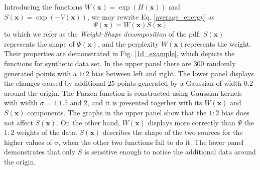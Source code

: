\documentclass[preprint,12pt]{elsarticle}
\begin{document}
Introducing the functions $W\left(\mathbf{x}\right)=\exp\left(H\left(\mathbf{x}\right)\right)$ and $S\left(\mathbf{x}\right)=\exp\left(-V\left(\mathbf{x}\right)\right)$, we may rewrite Eq. \ref{average_energy} as
\begin{equation}\label{weight_shape_decomposition}
  \Psi\left(\mathbf{x}\right)=W\left(\mathbf{x}\right)S\left(\mathbf{x}\right)
\end{equation}
to which we refer as the \textit{Weight-Shape decomposition} of the pdf. $S\left(\mathbf{x}\right)$ represents the shape of $\Psi\left(\mathbf{x}\right)$, and the perplexity $W\left(\mathbf{x}\right)$represents the weight. Their properties are demonstrated in Fig. \ref{1d_example}, which depicts the functions for synthetic data set. In the upper panel there are $300$ randomly generated points with a $1:2$ bias between left and right. The lower panel displays the changes caused by additional $25$ points generated by a Gaussian of width $0.2$ around the origin. The Parzen function is constructed using Gaussian kernels with width $\sigma=1$,$1.5$ and $2$, and it is presented together with its $W\left(\mathbf{x}\right)$ and $S\left(\mathbf{x}\right)$ components. The graphs in the upper panel show that the $1:2$ bias does not affect $S\left(\mathbf{x}\right)$. On the other hand, $W\left(\mathbf{x}\right)$ displays more correctly than $\Psi$ the $1:2$ weights of the data. $S\left(\mathbf{x}\right)$ describes the shape of the two sources for the higher values of $\sigma$, when the other two functions fail to do it. The lower panel demonstrates that only $S$ is sensitive enough to notice the additional data around the origin.
\end{document}
